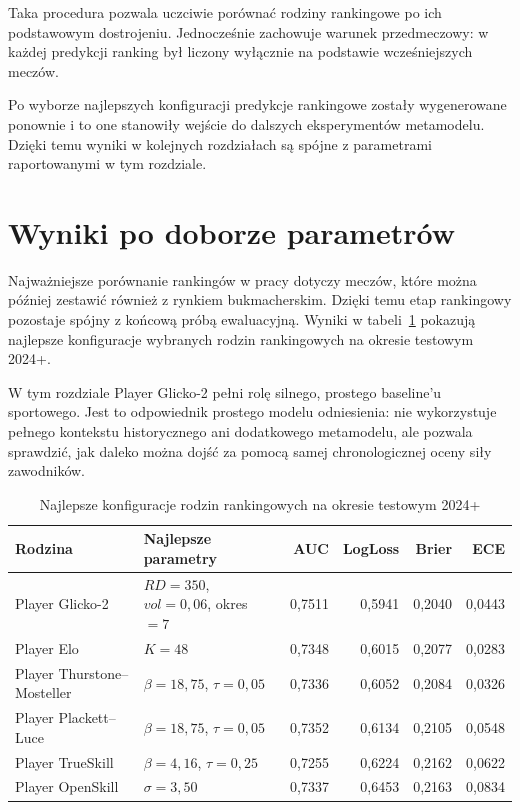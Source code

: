 Taka procedura pozwala uczciwie porównać rodziny rankingowe po ich podstawowym dostrojeniu. Jednocześnie zachowuje warunek przedmeczowy: w każdej predykcji ranking był liczony wyłącznie na podstawie wcześniejszych meczów.

Po wyborze najlepszych konfiguracji predykcje rankingowe zostały wygenerowane ponownie i to one stanowiły wejście do dalszych eksperymentów metamodelu. Dzięki temu wyniki w kolejnych rozdziałach są spójne z parametrami raportowanymi w tym rozdziale.

\section{Wyniki po doborze parametrów}

Najważniejsze porównanie rankingów w pracy dotyczy meczów, które można później zestawić również z rynkiem bukmacherskim. Dzięki temu etap rankingowy pozostaje spójny z końcową próbą ewaluacyjną. Wyniki w tabeli~\ref{tab:ranking_common_sample_results} pokazują najlepsze konfiguracje wybranych rodzin rankingowych na okresie testowym 2024+.

W tym rozdziale Player Glicko-2 pełni rolę silnego, prostego baseline'u sportowego. Jest to odpowiednik prostego modelu odniesienia: nie wykorzystuje pełnego kontekstu historycznego ani dodatkowego metamodelu, ale pozwala sprawdzić, jak daleko można dojść za pomocą samej chronologicznej oceny siły zawodników.

\begin{table}[H]
    \centering
    \small
    \caption{Najlepsze konfiguracje rodzin rankingowych na okresie testowym 2024+}
    \label{tab:ranking_common_sample_results}
    \begin{tabular}{p{3.1cm}p{4.1cm}rrrr}
        \toprule
        Rodzina & Najlepsze parametry & AUC & LogLoss & Brier & ECE \\
        \midrule
        Player Glicko-2 & $RD=350$, $vol=0{,}06$, okres $=7$ & 0{,}7511 & 0{,}5941 & 0{,}2040 & 0{,}0443 \\
        Player Elo & $K=48$ & 0{,}7348 & 0{,}6015 & 0{,}2077 & 0{,}0283 \\
        Player Thurstone--Mosteller & $\beta=18{,}75$, $\tau=0{,}05$ & 0{,}7336 & 0{,}6052 & 0{,}2084 & 0{,}0326 \\
        Player Plackett--Luce & $\beta=18{,}75$, $\tau=0{,}05$ & 0{,}7352 & 0{,}6134 & 0{,}2105 & 0{,}0548 \\
        Player TrueSkill & $\beta=4{,}16$, $\tau=0{,}25$ & 0{,}7255 & 0{,}6224 & 0{,}2162 & 0{,}0622 \\
        Player OpenSkill & $\sigma=3{,}50$ & 0{,}7337 & 0{,}6453 & 0{,}2163 & 0{,}0834 \\
        \bottomrule
    \end{tabular}
\end{table}

